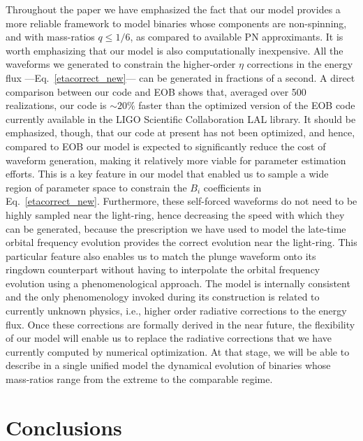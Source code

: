 \documentclass[aps,prd,showpacs,amssymb,floatfix,nofootinbib,superscriptaddress]{revtex4-1}%
\begin{document}
Throughout the paper we have emphasized the fact that our model provides a more reliable framework to model binaries whose components are non-spinning, and with mass-ratios \(q\leq 1/6\), as compared to available PN approximants. It is worth emphasizing that our model is also computationally inexpensive. All the waveforms we generated to constrain the higher-order \(\eta\) corrections in the energy flux ---Eq.~\eqref{etacorrect_new}--- can be generated in fractions of a second. A direct comparison between our code and EOB shows that, averaged over 500 realizations, our code is \(\sim20\%\) faster than the optimized version of the EOB code currently available in the LIGO Scientific Collaboration LAL library. It should be emphasized, though, that our code at present has not been optimized, and hence, compared to EOB our model is expected to significantly reduce the cost of waveform generation, making it relatively more viable for parameter estimation efforts. This is a key feature in our model that enabled us to sample a wide region of parameter space to constrain the \(B_i\) coefficients in Eq.~\eqref{etacorrect_new}. Furthermore, these self-forced waveforms do not need to be highly sampled near the light-ring, hence decreasing the speed with which they can be generated, because the prescription we have used to model the late-time orbital frequency evolution provides the correct evolution near the light-ring. This particular feature also enables us to match the plunge waveform onto its ringdown counterpart without having to interpolate the orbital frequency evolution using a phenomenological approach. The model is internally consistent and the only phenomenology invoked during its construction is related to currently unknown physics, i.e., higher order radiative corrections to the energy flux. Once these corrections are formally derived in the near future, the flexibility of our model will enable us to replace the radiative corrections that we have currently computed by numerical optimization.  At that stage, we will be able to describe in a single unified model the dynamical evolution of binaries whose mass-ratios range from the extreme to the comparable regime. 

\section{Conclusions}
\label{conclu}
\end{document}
